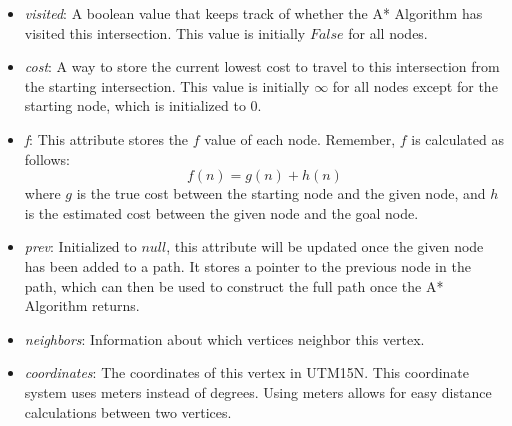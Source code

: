 \documentclass[conference]{IEEEtran}
\begin{document}
\begin{itemize}
    \item \textit{visited}: A boolean value that keeps track of whether the A* Algorithm has visited this intersection. This value is initially $False$ for all nodes.

    \item \textit{cost}: A way to store the current lowest cost to travel to this intersection from the starting intersection. This value is initially $\infty$ for all nodes except for the starting node, which is initialized to $0$.

    \item \textit{f}: This attribute stores the $f$ value of each node. Remember, $f$ is calculated as follows:
    \[f(n) = g(n) + h(n)\]
    where $g$ is the true cost between the starting node and the given node, and $h$ is the estimated cost between the given node and the goal node.

    \item \textit{prev}: Initialized to $null$, this attribute will be updated once the given node has been added to a path. It stores a pointer to the previous node in the path, which can then be used to construct the full path once the A* Algorithm returns.

    \item \textit{neighbors}: Information about which vertices neighbor this vertex.

    \item \textit{coordinates}: The coordinates of this vertex in UTM15N. This coordinate system uses meters instead of degrees. Using meters allows for easy distance calculations between two vertices.
    
\end{itemize}
\end{document}
